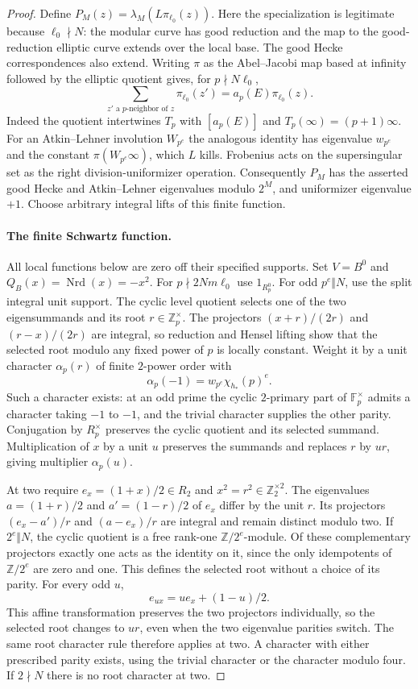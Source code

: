 \begin{proof}
Define $P_M(z)=\lambda_M(L\pi_{\ell_0}(z))$.  Here the specialization is
legitimate because $\ell_0\nmid N$: the modular curve has good
reduction and the map to the good-reduction elliptic curve extends
over the local base.  The good Hecke correspondences also extend.
Writing $\pi$ as the Abel--Jacobi map based at infinity followed by
the elliptic quotient gives, for $p\nmid N\ell_0$,
\[
 \sum_{z'\text{ a }p\text{-neighbor of }z}\pi_{\ell_0}(z')
       =a_p(E)\pi_{\ell_0}(z).
\]
Indeed the quotient intertwines $T_p$ with $[a_p(E)]$ and
$T_p(\infty)=(p+1)\infty$.  For an Atkin--Lehner involution
$W_{p^e}$ the analogous identity has eigenvalue $w_{p^e}$ and the
constant $\pi(W_{p^e}\infty)$, which $L$ kills.  Frobenius acts on
the supersingular set as the right division-uniformizer operation.
Consequently $P_M$ has the asserted good Hecke and Atkin--Lehner
eigenvalues modulo $2^M$, and uniformizer eigenvalue $+1$.
Choose arbitrary integral lifts of this finite function.

\paragraph{The finite Schwartz function.}
All local functions below are zero off their specified supports.
Set $V=B^0$ and $Q_B(x)=\operatorname{Nrd}(x)=-x^2$.
For $p\nmid2Nm\ell_0$ use $1_{R_p^0}$.
For odd $p^e\Vert N$, use the split integral unit support.  The
cyclic level quotient selects one of the two eigensummands and its
root $r\in\mathbb Z_p^\times$.  The projectors
$(x+r)/(2r)$ and $(r-x)/(2r)$ are integral, so reduction and Hensel
lifting show that the selected root modulo any fixed power of $p$
is locally constant.  Weight it by a unit character $\alpha_p(r)$
of finite $2$-power order with
\[
 \alpha_p(-1)=w_{p^e}\chi_{h_*}(p)^e. \tag{O.3}
\]
Such a character exists: at an odd prime the cyclic $2$-primary
part of $\mathbb F_p^\times$ admits a character taking $-1$ to
$-1$, and the trivial character supplies the other parity.
Conjugation by $R_p^\times$ preserves the cyclic quotient and its
selected summand.  Multiplication of $x$ by a unit $u$ preserves
the summands and replaces $r$ by $ur$, giving multiplier
$\alpha_p(u)$.

At two require $e_x=(1+x)/2\in R_2$ and
$x^2=r^2\in\mathbb Z_2^{\times2}$.  The eigenvalues
$a=(1+r)/2$ and $a'=(1-r)/2$ of $e_x$ differ by the unit $r$.
Its projectors $(e_x-a')/r$ and $(a-e_x)/r$ are integral and remain
distinct modulo two.  If $2^e\Vert N$, the cyclic quotient is a
free rank-one $\mathbb Z/2^e$-module.  Of these complementary
projectors exactly one acts as the identity on it, since the only
idempotents of $\mathbb Z/2^e$ are zero and one.  This defines the
selected root without a choice of its parity.  For every odd $u$,
\[
 e_{ux}=u e_x+(1-u)/2.
\]
This affine transformation preserves the two projectors
individually, so the selected root changes to $ur$, even when
the two eigenvalue parities switch.  The same root character rule
therefore applies at two.  A character with either prescribed
parity exists, using the trivial character or the character modulo
four.  If $2\nmid N$ there is no root character at two.


\end{proof}
